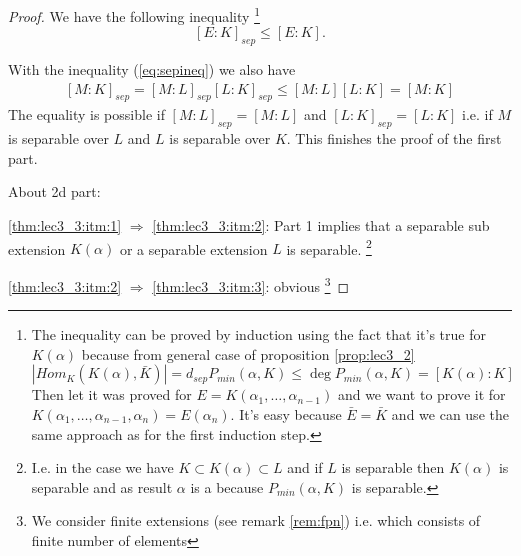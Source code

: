 \begin{theorem}
\begin{proof}
    We have the following inequality
    \footnote{
      The inequality can be proved by induction using the fact that
      it's true for $K\left(\alpha\right)$ because from general case
      of proposition \ref{prop:lec3_2} 
      \[
      \left|Hom_K\left(K\left(\alpha\right), \bar{K}\right)\right| =
      d_{sep} P_{min}\left(\alpha, K\right) \le
      \deg P_{min}\left(\alpha, K\right) =
      \left[K\left(\alpha\right): K \right]
      \]
      Then let it was proved for $E = K\left(\alpha_1, \dots,
      \alpha_{n-1}\right)$ and we want to prove it for
      $K\left(\alpha_1, \dots,
      \alpha_{n-1}, \alpha_n\right) = E\left(\alpha_n\right)$.
      It's easy because $\bar{E} = \bar{K}$  and we can use the same
      approach as for the first induction step.
    }
    \begin{equation}
      \left[E:K\right]_{sep} \le \left[E:K\right].
      \label{eq:sepineq}
    \end{equation}

    With the inequality (\ref{eq:sepineq}) we also have
    \begin{eqnarray}
    \left[M:K\right]_{sep} = 
    \left[M:L\right]_{sep} \left[L:K\right]_{sep} \le
    \left[M:L\right] \left[L:K\right] = \left[M:K\right]
    \nonumber
    \end{eqnarray}
    The equality is possible if
    $\left[M:L\right]_{sep} = \left[M:L\right]$ and 
    $\left[L:K\right]_{sep} = \left[L:K\right]$ i.e. if
    $M$ is separable over $L$ and $L$ is
    separable over $K$.
    This finishes the proof of the first part.
    
    About 2d part:

    \ref{thm:lec3_3:itm:1} $\Rightarrow$ \ref{thm:lec3_3:itm:2}:
    Part 1 implies that a separable sub extension
    $K\left(\alpha\right)$ or a separable extension $L$ is separable.
    \footnote{
      I.e. in the case we have $K \subset K\left(\alpha\right) \subset
      L$ and if $L$ is separable then $K\left(\alpha\right)$ is
      separable and as result $\alpha$ is a
       because $P_{min}\left(\alpha, K\right)$
      is separable.
    }
    
    \ref{thm:lec3_3:itm:2} $\Rightarrow$ \ref{thm:lec3_3:itm:3}:
    obvious
    \footnote{
      We consider finite extensions (see remark \ref{rem:fpn})
      i.e. which consists of finite number of elements
    }


\end{proof}
\end{theorem}
